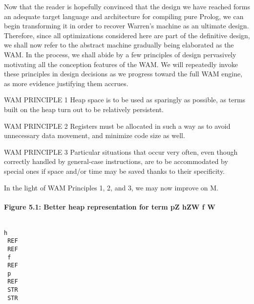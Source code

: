 \label{warren5}\secdown

Now that the reader is hopefully convinced that the design we have reached forms
an adequate target language and architecture for compiling pure Prolog, we can
begin transforming it in order to recover Warren’s machine as an ultimate design.
Therefore, since all optimizations considered here are part of the definitive design,
we shall now refer to the abstract machine gradually being elaborated as the WAM.
In the process, we shall abide by a few principles of design pervasively motivating
all the conception features of the WAM. We will repeatedly invoke these principles
in design decisions as we progress toward the full WAM engine, as more evidence
justifying them accrues.

\textsc{WAM PRINCIPLE 1} Heap space is to be used as sparingly as possible, as
terms built on the heap turn out to be relatively persistent.

\textsc{WAM PRINCIPLE 2} Registers must be allocated in such a way as to avoid
unnecessary data movement, and minimize code size as well.

\textsc{WAM PRINCIPLE 3} Particular situations that occur very often, even
though correctly handled by general-case instructions, are to be accommodated by special
ones if space and/or time may be saved thanks to their specificity.

In the light of WAM Principles 1, 2, and 3, we may now improve on M.

\paragraph{Figure 5.1: Better heap representation for term pZ hZW f W}
\begin{verbatim}

h
 REF 
 REF
 f 
 REF
 p
 REF 
 STR
 STR
\end{verbatim}













\secup
